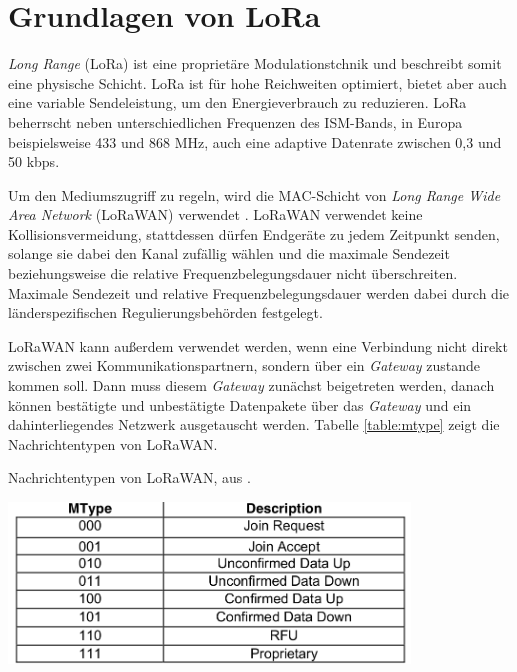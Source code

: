 \section{Grundlagen von LoRa}
\emph{Long Range} (LoRa) ist eine proprietäre Modulationstchnik und beschreibt somit eine physische Schicht.
LoRa ist für hohe Reichweiten optimiert, bietet aber auch eine variable Sendeleistung, um den Energieverbrauch zu reduzieren.
LoRa beherrscht neben unterschiedlichen Frequenzen des ISM-Bands, in Europa beispielsweise 433 und 868 MHz, auch eine adaptive Datenrate zwischen 0,3 und 50 kbps.

Um den Mediumszugriff zu regeln, wird die MAC-Schicht von \emph{Long Range Wide Area Network} (LoRaWAN) verwendet \cite{lora2015spec}.
LoRaWAN verwendet keine Kollisionsvermeidung, stattdessen dürfen Endgeräte zu jedem Zeitpunkt senden, solange sie dabei den Kanal zufällig wählen und die maximale Sendezeit beziehungsweise die relative Frequenzbelegungsdauer nicht überschreiten.
Maximale Sendezeit und relative Frequenzbelegungsdauer werden dabei durch die länderspezifischen Regulierungsbehörden festgelegt.

LoRaWAN kann außerdem verwendet werden, wenn eine Verbindung nicht direkt zwischen zwei Kommunikationspartnern, sondern über ein \emph{Gateway} zustande kommen soll.
Dann muss diesem \emph{Gateway} zunächst beigetreten werden, danach können bestätigte und unbestätigte Datenpakete über das \emph{Gateway} und ein dahinterliegendes Netzwerk ausgetauscht werden.
Tabelle \ref{table:mtype} zeigt die Nachrichtentypen von LoRaWAN.

\begin{table}[h]
  \centering
  \caption{Nachrichtentypen von LoRaWAN, aus \cite{lora2015spec}.}
	\includegraphics[width=0.8\textwidth]{images/mtype.png}
  \label{table:mtype}
\end{table}
